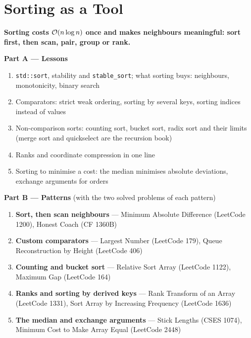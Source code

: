 \chapter{Sorting as a Tool}
\label{ch:sorting}

\begin{tcolorbox}[enhanced, colback=white, colframe=secondaryblue, boxrule=1pt, arc=2mm]
\textbf{\large\textcolor{primaryblue}{Sorting costs $\mathcal{O}(n \log n)$ once and makes neighbours meaningful: sort first, then scan, pair, group or rank.}}
\end{tcolorbox}


\begin{plannedbox}
\textbf{Part A --- Lessons}
\begin{enumerate}[leftmargin=*, label=\textbf{A\arabic*.}, itemsep=1pt]
    \item \texttt{std::sort}, stability and \texttt{stable\_sort}; what sorting buys: neighbours, monotonicity, binary search
    \item Comparators: strict weak ordering, sorting by several keys, sorting indices instead of values
    \item Non-comparison sorts: counting sort, bucket sort, radix sort and their limits (merge sort and quickselect are the recursion book)
    \item Ranks and coordinate compression in one line
    \item Sorting to minimise a cost: the median minimises absolute deviations, exchange arguments for orders
\end{enumerate}
\textbf{Part B --- Patterns} (with the two solved problems of each pattern)
\begin{enumerate}[leftmargin=*, label=\textbf{P\arabic*.}, itemsep=1pt]
    \item \textbf{Sort, then scan neighbours} --- Minimum Absolute Difference {\small\color{darkgray}(LeetCode 1200)}, Honest Coach {\small\color{darkgray}(CF 1360B)}
    \item \textbf{Custom comparators} --- Largest Number {\small\color{darkgray}(LeetCode 179)}, Queue Reconstruction by Height {\small\color{darkgray}(LeetCode 406)}
    \item \textbf{Counting and bucket sort} --- Relative Sort Array {\small\color{darkgray}(LeetCode 1122)}, Maximum Gap {\small\color{darkgray}(LeetCode 164)}
    \item \textbf{Ranks and sorting by derived keys} --- Rank Transform of an Array {\small\color{darkgray}(LeetCode 1331)}, Sort Array by Increasing Frequency {\small\color{darkgray}(LeetCode 1636)}
    \item \textbf{The median and exchange arguments} --- Stick Lengths {\small\color{darkgray}(CSES 1074)}, Minimum Cost to Make Array Equal {\small\color{darkgray}(LeetCode 2448)}
\end{enumerate}
\end{plannedbox}
